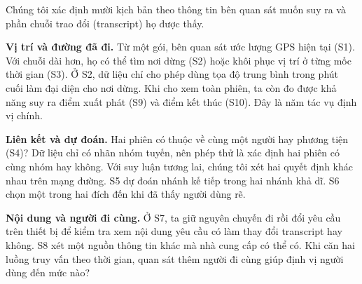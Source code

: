 Chúng tôi xác định mười kịch bản theo thông tin bên quan sát muốn suy ra
và phần chuỗi trao đổi (transcript) họ được thấy.

\smallskip\noindent\textbf{Vị trí và đường đã đi.}
Từ một gói, bên quan sát ước lượng GPS hiện tại (S1). Với chuỗi dài hơn,
họ có thể tìm nơi dừng (S2) hoặc khôi phục vị trí ở từng mốc thời gian (S3).
Ở S2, dữ liệu chỉ cho phép dùng tọa độ trung bình trong phút cuối làm đại
diện cho nơi dừng. Khi cho xem toàn phiên, ta còn đo được khả năng suy ra
điểm xuất phát (S9) và điểm kết thúc (S10). Đây là năm tác vụ định vị chính.

\smallskip\noindent\textbf{Liên kết và dự đoán.}
Hai phiên có thuộc về cùng một người hay phương tiện (S4)? Dữ liệu chỉ có
nhãn nhóm tuyến, nên phép thử là xác định hai phiên có cùng nhóm hay không.
Với suy luận tương lai, chúng tôi xét hai quyết định khác nhau trên mạng
đường. S5 dự đoán nhánh kế tiếp trong hai nhánh khả dĩ. S6 chọn một trong
hai đích đến khi đã thấy người dùng rẽ.

\smallskip\noindent\textbf{Nội dung và người đi cùng.}
Ở S7, ta giữ nguyên chuyến đi rồi đổi yêu cầu trên thiết bị để kiểm tra xem
nội dung yêu cầu có làm thay đổi transcript hay không. S8 xét một nguồn
thông tin khác mà nhà cung cấp có thể có. Khi căn hai luồng truy vấn theo
thời gian, quan sát thêm người đi cùng giúp định vị người dùng đến mức nào?
